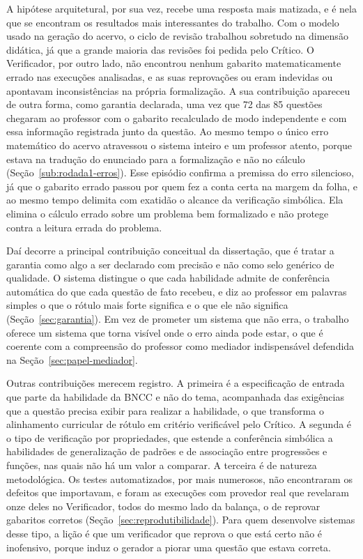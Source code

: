 A hipótese arquitetural, por sua vez, recebe uma resposta mais matizada, e é nela que se encontram os
resultados mais interessantes do trabalho. Com o modelo usado na geração do acervo, o ciclo de revisão
trabalhou sobretudo na dimensão didática, já que a grande maioria das revisões foi pedida pelo Crítico.
O Verificador, por outro lado, não encontrou nenhum gabarito matematicamente errado nas execuções
analisadas, e as suas reprovações ou eram indevidas ou apontavam inconsistências na própria
formalização. A sua contribuição apareceu de outra forma, como garantia declarada, uma vez que 72 das
85 questões chegaram ao professor com o gabarito recalculado de modo independente e com essa
informação registrada junto da questão. Ao mesmo tempo o único erro matemático do acervo atravessou o
sistema inteiro e um professor atento, porque estava na tradução do enunciado para a formalização e
não no cálculo (Seção~\ref{sub:rodada1-erros}). Esse episódio confirma a premissa do erro silencioso,
já que o gabarito errado passou por quem fez a conta certa na margem da folha, e ao mesmo tempo
delimita com exatidão o alcance da verificação simbólica. Ela elimina o cálculo errado sobre um
problema bem formalizado e não protege contra a leitura errada do problema.

Daí decorre a principal contribuição conceitual da dissertação, que é tratar a garantia como algo a
ser declarado com precisão e não como selo genérico de qualidade. O sistema distingue o que cada
habilidade admite de conferência automática do que cada questão de fato recebeu, e diz ao professor
em palavras simples o que o rótulo mais forte significa e o que ele não significa
(Seção~\ref{sec:garantia}). Em vez de prometer um sistema que não erra, o trabalho oferece um sistema
que torna visível onde o erro ainda pode estar, o que é coerente com a compreensão do professor como
mediador indispensável defendida na Seção~\ref{sec:papel-mediador}.

Outras contribuições merecem registro. A primeira é a especificação de entrada que parte da habilidade
da BNCC e não do tema, acompanhada das exigências que a questão precisa exibir para realizar a
habilidade, o que transforma o alinhamento curricular de rótulo em critério verificável pelo Crítico.
A segunda é o tipo de verificação por propriedades, que estende a conferência simbólica a habilidades
de generalização de padrões e de associação entre progressões e funções, nas quais não há um valor a
comparar. A terceira é de natureza metodológica. Os testes automatizados, por mais numerosos, não
encontraram os defeitos que importavam, e foram as execuções com provedor real que revelaram onze
deles no Verificador, todos do mesmo lado da balança, o de reprovar gabaritos corretos
(Seção~\ref{sec:reprodutibilidade}). Para quem desenvolve sistemas desse tipo, a lição é que um
verificador que reprova o que está certo não é inofensivo, porque induz o gerador a piorar uma questão
que estava correta.

